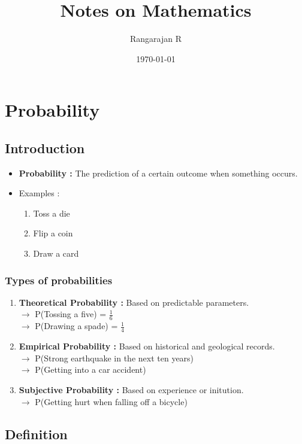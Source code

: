 \documentclass[13pt]{book}
\title{Notes on Mathematics}
\author{Rangarajan R}
\date{\today}
\begin{document}
\maketitle

\tableofcontents

\chapter{Probability}
\section{Introduction}
\begin{itemize}
\item \textbf{Probability : } The prediction of a certain outcome when something occurs.
\item Examples :
  \begin{enumerate}
  \item Toss a die
  \item Flip a coin
  \item Draw a card
  \end{enumerate}
\end{itemize}
\subsection{Types of probabilities}
\begin{enumerate}
\item \textbf{Theoretical Probability : } Based on predictable parameters. \\
  \(\rightarrow\) P(Tossing a five) = \(\frac{1}{6}\) \\
  \(\rightarrow\) P(Drawing a spade) = \(\frac{1}{4}\) 
\item \textbf{Empirical Probability : } Based on historical and geological records. \\
  \(\rightarrow\) P(Strong earthquake in the next ten years) \\
  \(\rightarrow\) P(Getting into a car accident)
\item \textbf{Subjective Probability : } Based on experience or initution. \\
  \(\rightarrow\) P(Getting hurt when falling off a bicycle)
\end{enumerate}
\section{Definition}
\end{document}
